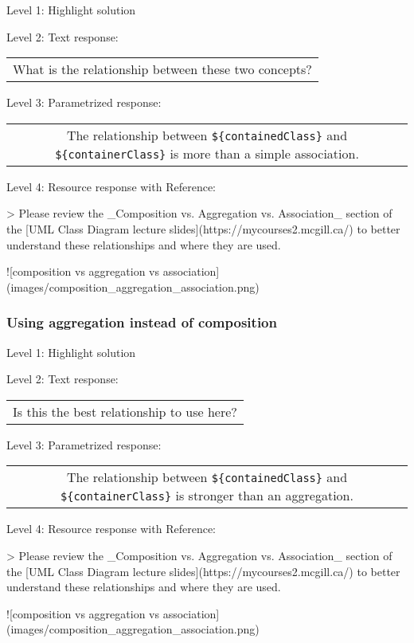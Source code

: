 \noindent Level 1: Highlight solution \medskip

\noindent Level 2: Text response: \medskip

\begin{tabular}{|c}
What is the relationship between these two concepts?
\end{tabular} \medskip

\noindent Level 3: Parametrized response: \medskip

\begin{tabular}{|c}
The relationship between \verb|${containedClass}| and \verb|${containerClass}| is more than a simple association.
\end{tabular} \medskip

\noindent Level 4: Resource response with Reference:

> Please review the _Composition vs. Aggregation vs. Association_ section of 
the [UML Class Diagram lecture slides](https://mycourses2.mcgill.ca/) to 
better understand these relationships and where they are used.

![composition vs aggregation vs association](images/composition_aggregation_association.png)


\subsubsection{Using aggregation instead of composition}

\noindent Level 1: Highlight solution \medskip

\noindent Level 2: Text response: \medskip

\begin{tabular}{|c}
Is this the best relationship to use here?
\end{tabular} \medskip

\noindent Level 3: Parametrized response: \medskip

\begin{tabular}{|c}
The relationship between \verb|${containedClass}| and \verb|${containerClass}| is stronger than an aggregation.
\end{tabular} \medskip

\noindent Level 4: Resource response with Reference:

> Please review the _Composition vs. Aggregation vs. Association_ section of 
the [UML Class Diagram lecture slides](https://mycourses2.mcgill.ca/) to 
better understand these relationships and where they are used.

![composition vs aggregation vs association](images/composition_aggregation_association.png)


